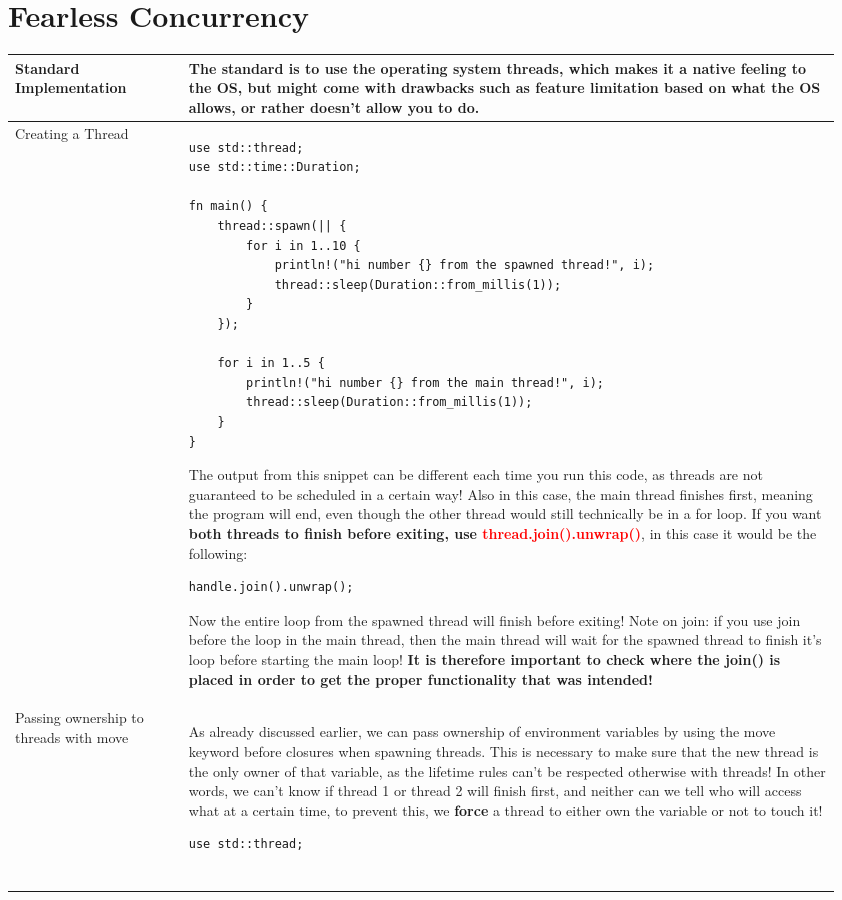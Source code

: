 \documentclass[main.tex,fontsize=8pt,paper=a4,paper=portrait,DIV=calc,]{scrartcl}
\begin{document}
\begin{table}[ht!]
\section{Fearless Concurrency}
\begin{tabular}{|m{0.2\linewidth}|m{0.755\linewidth}|}
\hline
Standard Implementation & 
The standard is to use the operating system threads, which makes it a native feeling to the OS, but might come with drawbacks such as feature limitation based on what the OS allows, or rather doesn't allow you to do.\\
\hline
Creating a Thread & 
\begin{lstlisting}
use std::thread;
use std::time::Duration;

fn main() {
    thread::spawn(|| {
        for i in 1..10 {
            println!("hi number {} from the spawned thread!", i);
            thread::sleep(Duration::from_millis(1));
        }
    });

    for i in 1..5 {
        println!("hi number {} from the main thread!", i);
        thread::sleep(Duration::from_millis(1));
    }
}
\end{lstlisting}
The output from this snippet can be different each time you run this code, as threads are not guaranteed to be scheduled in a certain way!\newline
Also in this case, the main thread finishes first, meaning the program will end, even though the other thread would still technically be in a for loop.\newline
If you want \textbf{both threads to finish before exiting, use \textcolor{red}{thread.join().unwrap()}}, in this case it would be the following:\newline
\begin{lstlisting}
handle.join().unwrap();
\end{lstlisting}
Now the entire loop from the spawned thread will finish before exiting!\newline
\textcolor{OliveGreen}{Note on join: if you use join before the loop in the main thread, then the main thread will wait for the spawned thread to finish it's loop before starting the main loop!\newline
\textbf{It is therefore important to check where the join() is placed in order to get the proper functionality that was intended!}}\\
\hline
Passing ownership to threads with move & 
As already discussed earlier, we can pass ownership of environment variables by using the move keyword before closures when spawning threads.\newline
This is necessary to make sure that the new thread is the only owner of that variable, as the lifetime rules can't be respected otherwise with threads! \newline
\textcolor{OliveGreen}{In other words, we can't know if thread 1 or thread 2 will finish first, and neither can we tell who will access what at a certain time, to prevent this, we \textbf{force} a thread to either own the variable or not to touch it!}\newline
\begin{lstlisting}
use std::thread;


\end{lstlisting}
\end{tabular}
\end{table}
\end{document}
